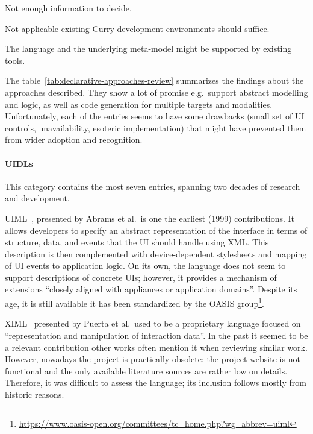 \begin{table}[]
\begin{threeparttable}[b]
\begin{tabularx}{\textwidth}{lrCCC}
            \bottomrule
        \end{tabularx}
        \begin{tablenotes}
            \item [1] Not enough information to decide.
            \item [2] Not applicable\,\textemdash\,existing Curry development environments should suffice.
            \item [3] The language and the underlying meta-model might be supported by existing tools.
        \end{tablenotes}
    \end{threeparttable}
\end{table}

The table~\ref{tab:declarative-approaches-review} summarizes the findings about the approaches described.
They show a lot of promise\,\textemdash\,e.g.\ support abstract modelling and logic, as well as code generation for multiple targets and modalities.
Unfortunately, each of the entries seems to have some drawbacks (small set of UI controls, unavailability, esoteric implementation) that might have prevented them from wider adoption and recognition.

\paragraph{UIDLs}

This category contains the most\,\textemdash\,seven entries, spanning two decades of research and development.

UIML~\cite{Abrams1999-ei}, presented by Abrams et al.\ is one the earliest (1999) contributions.
It allows developers to specify an abstract representation of the interface in terms of structure, data, and events that the UI should handle using XML.
This description is then complemented with device-dependent stylesheets and mapping of UI events to application logic.
On its own, the language does not seem to support descriptions of concrete UIs;
however, it provides a mechanism of extensions \enquote{closely aligned with appliances or application domains}.
Despite its age, it is still available\,\textemdash\,it has been standardized by the OASIS group\footnote{\url{https://www.oasis-open.org/committees/tc_home.php?wg_abbrev=uiml}}.

XIML~\cite{puerta2001ximl} presented by Puerta et al.\ used to be a proprietary language focused on \enquote{representation and manipulation of interaction data}.
In the past it seemed to be a relevant contribution\,\textemdash\,other works often mention it when reviewing similar work.
However, nowadays the project is practically obsolete: the project website is not functional and the only available literature sources are rather low on details.
Therefore, it was difficult to assess the language;
its inclusion follows mostly from historic reasons.

